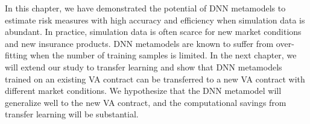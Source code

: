 In this chapter, we have demonstrated the potential of DNN metamodels to estimate risk measures with high accuracy and efficiency when simulation data is abundant.
In practice, simulation data is often scarce for new market conditions and new insurance products.
DNN metamodels are known to suffer from over-fitting when the number of training samples is limited.
In the next chapter, we will extend our study to transfer learning and show that DNN metamodels trained on an existing VA contract can be transferred to a new VA contract with different market conditions.
We hypothesize that the DNN metamodel will generalize well to the new VA contract, and the computational savings from transfer learning will be substantial.